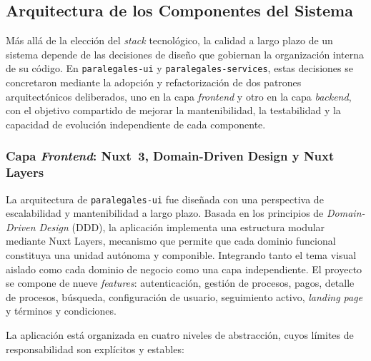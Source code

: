 \subsection{Arquitectura de los Componentes del Sistema}\label{subsec:arquitectura}

Más allá de la elección del \textit{stack} tecnológico, la calidad a largo plazo de un sistema depende de las decisiones de diseño que gobiernan la organización interna de su código. En \texttt{paralegales-ui} y \texttt{paralegales-services}, estas decisiones se concretaron mediante la adopción y refactorización de dos patrones arquitectónicos deliberados, uno en la capa \textit{frontend} y otro en la capa \textit{backend}, con el objetivo compartido de mejorar la mantenibilidad, la testabilidad y la capacidad de evolución independiente de cada componente.

\subsubsection{Capa \textit{Frontend}: Nuxt~3, Domain-Driven Design y Nuxt Layers}

La arquitectura de \texttt{paralegales-ui} fue diseñada con una perspectiva de escalabilidad y mantenibilidad a largo plazo. Basada en los principios de \textit{Domain-Driven Design} (DDD), la aplicación implementa una estructura modular mediante Nuxt Layers, mecanismo que permite que cada dominio funcional constituya una unidad autónoma y componible. Integrando tanto el tema visual aislado como cada dominio de negocio como una capa independiente. El proyecto se compone de nueve \textit{features}: autenticación, gestión de procesos, pagos, detalle de procesos, búsqueda, configuración de usuario, seguimiento activo, \textit{landing page} y términos y condiciones.

La aplicación está organizada en cuatro niveles de abstracción, cuyos límites de responsabilidad son explícitos y estables:

